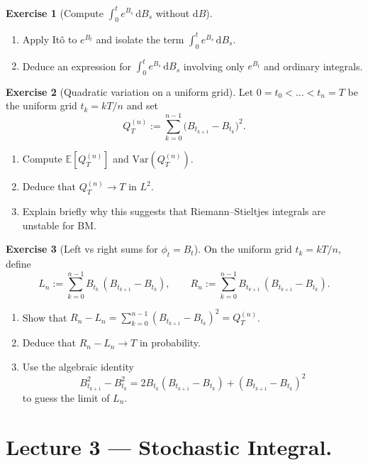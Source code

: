 \documentclass[11pt]{article}
\newcommand{\E}{\mathbb{E}}
\newcommand{\1}{\mathbf{1}}
\theoremstyle{definition}
\newtheorem{exercise}{Exercise}[section]
\begin{document}
\begin{exercise}[Compute $\int_0^t e^{B_s}\,\mathrm{d} B_s$ without $\mathrm{d} B$]
\begin{enumerate}
\item Apply It\^o to $e^{B_t}$ and isolate the term $\int_0^t e^{B_s}\,\mathrm{d} B_s$.
\item Deduce an expression for $\int_0^t e^{B_s}\,\mathrm{d} B_s$ involving only $e^{B_t}$ and ordinary integrals.
\end{enumerate}
\end{exercise}

\begin{exercise}[Quadratic variation on a uniform grid]
Let $0=t_0<\dots<t_n=T$ be the uniform grid $t_k=kT/n$ and set
$$
Q_T^{(n)}:=\sum_{k=0}^{n-1}\big(B_{t_{k+1}}-B_{t_k}\big)^2.
$$
\begin{enumerate}
\item Compute $\E[Q_T^{(n)}]$ and $\mathrm{Var}(Q_T^{(n)})$.
\item Deduce that $Q_T^{(n)}\to T$ in $L^2$.
\item Explain briefly why this suggests that Riemann--Stieltjes integrals are unstable for BM.
\end{enumerate}
\end{exercise}

\begin{exercise}[Left vs right sums for $\phi_t=B_t$]
On the uniform grid $t_k=kT/n$, define
$$
L_n:=\sum_{k=0}^{n-1} B_{t_k}\,(B_{t_{k+1}}-B_{t_k}),
\qquad
R_n:=\sum_{k=0}^{n-1} B_{t_{k+1}}\,(B_{t_{k+1}}-B_{t_k}).
$$
\begin{enumerate}
\item Show that $R_n-L_n=\sum_{k=0}^{n-1}(B_{t_{k+1}}-B_{t_k})^2=Q_T^{(n)}$.
\item Deduce that $R_n-L_n\to T$ in probability.
\item Use the algebraic identity
$$
B_{t_{k+1}}^2-B_{t_k}^2 = 2B_{t_k}(B_{t_{k+1}}-B_{t_k})+(B_{t_{k+1}}-B_{t_k})^2
$$
to guess the limit of $L_n$.
\end{enumerate}
\end{exercise}

\section{Lecture 3 --- Stochastic Integral.}
\end{document}
